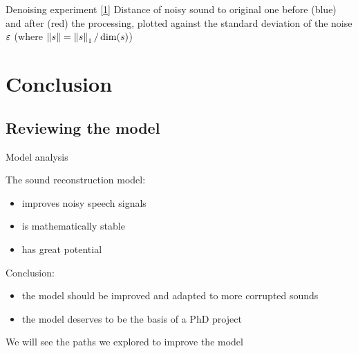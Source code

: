 \documentclass[10pt,american,ignorenonframetext,aspectratio=1610]{beamer}
\providecommand{\tightlist}{%
  \setlength{\itemsep}{0pt}\setlength{\parskip}{0pt}}
\theoremstyle{remark}
\begin{document}
\begin{frame}{Denoising experiment
{[}\protect\hyperlink{ref-asswad2021}{1}{]}}
Distance of noisy sound to original one before (blue) and after (red)
the processing, plotted against the standard deviation of the noise
\(\varepsilon\) (where \(\left\lVert s\right\rVert=\left\lVert s\right\rVert_1/\dim(s)\))

\end{frame}

\hypertarget{conclusion}{%
\section{Conclusion}\label{conclusion}}

\hypertarget{reviewing-the-model}{%
\subsection{Reviewing the model}\label{reviewing-the-model}}

\begin{frame}{Model analysis}
\protect\hypertarget{model-analysis}{}

The sound reconstruction model:

\begin{itemize}
\tightlist
\item
  improves noisy speech signals
\item
  is mathematically stable
\item
  has great potential
\end{itemize}

Conclusion:

\begin{itemize}
\tightlist
\item
  the model should be improved and adapted to more corrupted sounds
\item
  the model deserves to be the basis of a PhD project
\end{itemize}

We will see the paths we explored to improve the model

\end{frame}
\end{document}
